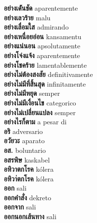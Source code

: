 \textbf{ อย่างเด่ันชัด  } aparentemente \\
\textbf{ อย่างเลวร้าย  } malu \\
\textbf{ อย่างเลื่อมใส  } admirando \\
\textbf{ อย่างเหนื่อยอ่อน  } kansamentu \\
\textbf{ อย่างแน่นอน  } apsolutamente \\
\textbf{ อย่างโจ่งแจ้ง  } aparentemente \\
\textbf{ อย่างโชคร้าย  } lamentablemente \\
\textbf{ อย่างไม่ต้องสงสัย  } definitivamente \\
\textbf{ อย่างไม่มีที่สิ้นสุด  } infinitamente \\
\textbf{ อย่างไม่มีหยุด  } semper \\
\textbf{ อย่างไม่มีเงื่อนไข  } categorico \\
\textbf{ อย่างไม่เปลี่ยนแปลง  } semper \\
\textbf{ อย่างไรก็ตาม  } a pesar di \\
\textbf{ อริ  } adversario \\
\textbf{ อวัยวะ  } aparato \\
\textbf{ อส.  } boluntario \\
\textbf{ อสรพิษ  } kaskabel \\
\textbf{ อหิวาตกโรค  } kólera \\
\textbf{ อหิวา่ตกโรค  } kólera \\
\textbf{ ออก  } sali \\
\textbf{ ออกคำสั่ง  } dekreto \\
\textbf{ ออกจาก  } sali \\
\textbf{ ออกนอกเส้นทาง  } sali \\
